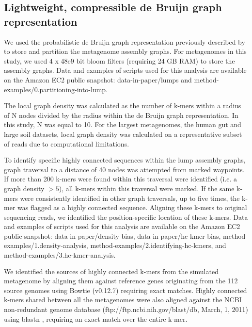 \documentclass[10pt]{article}
\begin{document}
\subsection*{Lightweight, compressible de Bruijn graph representation}

We used the probabilistic de Bruijn graph representation previously described by \cite{Pell:2012cq}  to store and partition the metagenome assembly
graphs.  For metagenomes in this study, we used 4 x 48e9 bit bloom
filters (requiring 24 GB RAM) to store the assembly graphs.  Data and examples of scripts used for this analysis are
available on the Amazon EC2 public snapshot: data-in-paper/lumps and
method-examples/0.partitioning-into-lump.


The local graph density was calculated as the number of
k-mers within a radius of N nodes divided by the radius within the de Bruijn graph representation.  In this
study, N was equal to 10.  For the largest metagenomes, the human gut
and large soil datasets, local graph density was calculated on a
representative subset of reads due to computational limitations.

To identify specific highly connected sequences within the lump
assembly graphs, graph traversal to a distance of 40 nodes was
attempted from marked waypoints.  If more than 200 k-mers were found
within this traversal were identified (i.e. a graph density $> 5$), all
k-mers within this traversal were marked. If the same k-mers were consistently identified
in other graph traversals, up to five times, the k-mer was flagged as
a highly connected sequence.  Aligning these k-mers to original
sequencing reads, we identified the position-specific location of
these k-mers.  Data and examples of scripts used for this analysis are
available on the Amazon EC2 public snapshot:
data-in-paper/density-bias, data-in-paper/hc-kmer-bias,
method-examples/1.density-analysis,
method-examples/2.identifying-hc-kmers, and
method-examples/3.hc-kmer-analysis.

We identified the sources of highly connected k-mers from the
simulated metagenome by aligning them against reference genes
originating from the 112 source genomes using Bowtie (v0.12.7)
requiring exact matches.  Highly connected k-mers shared between all
the metagenomes were also aligned against the NCBI non-redundant
genome database (ftp://ftp.ncbi.nih.gov/blast/db, March, 1, 2011)
using blastn \cite{Altschul:1990p1335}, requiring an exact match over
the entire k-mer.
\end{document}
